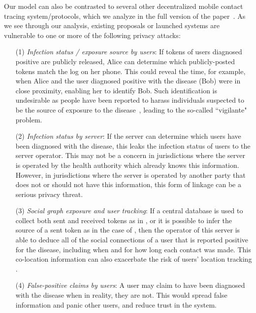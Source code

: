 Our model can also be contrasted to several other decentralized mobile contact tracing system/protocols, which we analyze in the full version of the paper~\cite{epione}. As we see through our analysis, existing proposals or launched systems are vulnerable to one or more of the following privacy attacks:

\begin{itemize}%
	\item[(1)] {\em Infection status / exposure source by users}: If tokens of users diagnosed positive are publicly released, Alice can determine which publicly-posted tokens match the log on her phone. This could reveal the time, for example, when Alice and the user diagnosed positive with the disease (Bob) were in close proximity, enabling her to identify Bob. Such identification is undesirable as people have been reported to harass individuals suspected to be the source of exposure to the disease~\cite{korea-harassment}, leading to the so-called ``vigilante" problem.
	
	\item[(2)] {\em Infection status by server}: If the server can determine which users have been diagnosed with the disease, this leaks the infection status of users to the server operator. This may not be a concern in jurisdictions where the server is operated by the health authority which already knows this information. However, in jurisdictions where the server is operated by another party that does not or should not have this information, this form of linkage can be a serious privacy threat.
	
	\item[(3)] {\em Social graph exposure and user tracking}: If a central database is used to collect both sent and received tokens as in \cite{Covid-watch}, or it is possible to infer the source of a sent token as in the case of \cite{TraceTogether}, then the operator of this server is able to deduce all of the social connections of a user that is reported positive for the disease, including when and for how long each contact was made. This co-location information can also exacerbate the risk of users' location tracking \cite{olteanu2016quantifying, shokri2011quantifying}.
	
	
	\item[(4)] {\em False-positive claims by users}: A user may claim to have been diagnosed with the disease when in reality, they are not. This would spread false information and panic other users, and reduce trust in the system.
	
\end{itemize}


